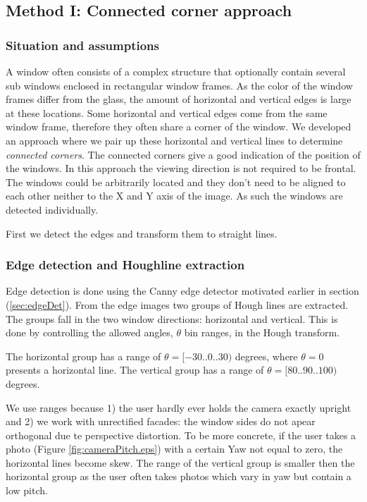 \subsection{Method I: Connected corner approach} 
\subsubsection{Situation and assumptions}
A window often consists of a complex structure that optionally contain several sub windows enclosed in rectangular window
frames.  As the color of the window frames differ from the glass, the amount of
horizontal and vertical edges is large at these locations.  
Some horizontal and vertical edges come from the same window frame, therefore they often
share a corner of the window.  We developed an approach where we pair up these
horizontal and vertical lines to determine \emph{connected corners}.
The connected corners give a good indication of the position of the windows. 
In this approach the viewing direction is not required to be frontal.
The windows could be arbitrarily located and they don't need
to be aligned to each other neither to the X and Y axis of the image.
As such the windows are detected individually.

First we detect the edges and transform them to straight lines.

\subsubsection{Edge detection and Houghline extraction}
Edge detection is done using the Canny edge detector motivated earlier in
section (\ref{sec:edgeDet}).
From the edge images two groups of Hough lines are extracted. 
The groups fall in the two window directions: horizontal and vertical.
This is done by controlling the allowed angles, $\theta$ bin ranges, in the Hough transform.

The horizontal group has a range of $\theta = [-30..0..30)$ degrees, where $\theta = 0$ presents a horizontal line. 
The vertical group has a range of $\theta = [80..90..100)$ degrees. 

We use ranges because 1) the user hardly ever holds the camera exactly
upright and 2) we work with unrectified facades: the window sides do
not apear orthogonal due te perspective distortion.  To be more concrete, if the user takes a photo (Figure
\ref{fig:cameraPitch.eps}) with a certain Yaw not equal to zero, the horizontal lines become
skew.  The range of the vertical group is smaller then the horizontal group as
the user often takes photos which vary in yaw but contain a low pitch.

